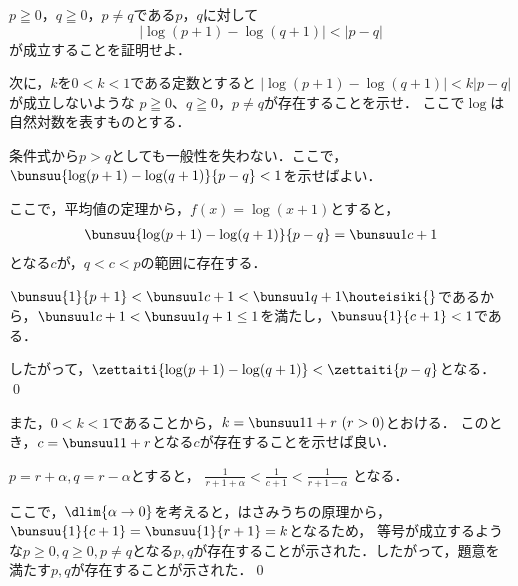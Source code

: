 \begin{problem}
  $p\geqq0$，$q\geqq0$，$p \neq q$である$p$，$q$に対して
\[ |\log(p+1)-\log(q+1)|<|p-q| \]
が成立することを証明せよ．

次に，$k$を$0<k<1$である定数とすると
$|\log(p+1)-\log(q+1)|<k|p-q|$が成立しないような
$p\geqq0$、$q\geqq0$，$p \neq q$が存在することを示せ．
ここで$\log$は自然対数を表すものとする．
\end{problem}




条件式から$p>q$としても一般性を失わない．ここで，
$\bunsuu{\log(p+1) - \log(q+1)}{p-q} < 1$を示せばよい．

ここで，平均値の定理から，$f(x) = \log(x+1)$とすると，
\begin{align}
\bunsuu{\log(p+1) - \log(q+1)}{p-q} = \bunsuu1{c+1} \label{197441}
\end{align}
となる$c$が，$q < c < p$の範囲に存在する．

$\bunsuu{1}{p+1} < \bunsuu1{c+1} < \bunsuu1{q+1} \houteisiki{\label{197442}}$であるから，$\bunsuu1{c+1} < \bunsuu1{q+1} \leq 1$を満たし，$\bunsuu{1}{c+1} < 1$である．

したがって，$\zettaiti{\log(p+1) - \log(q+1)} < \zettaiti{p-q}$となる．
\qed

また，$0 < k < 1$であることから，$k = \bunsuu1{1+r}\ (r>0)$とおける．
このとき，$c = \bunsuu1{1+r}$となる$c$が存在することを示せば良い．

$p = r + \alpha, q = r - \alpha$とすると，
$\frac{1}{r+1+\alpha} < \frac{1}{c+1} < \frac{1}{r+1-\alpha}$
となる．

ここで，$\dlim{\alpha \to 0}$を考えると，はさみうちの原理から，
$\bunsuu{1}{c+1} = \bunsuu{1}{r+1} = k$となるため，
等号が成立するような$p \geq 0, q \geq 0, p \neq q$となる$p,q$が存在することが示された．したがって，題意を満たす$p,q$が存在することが示された．\qed

